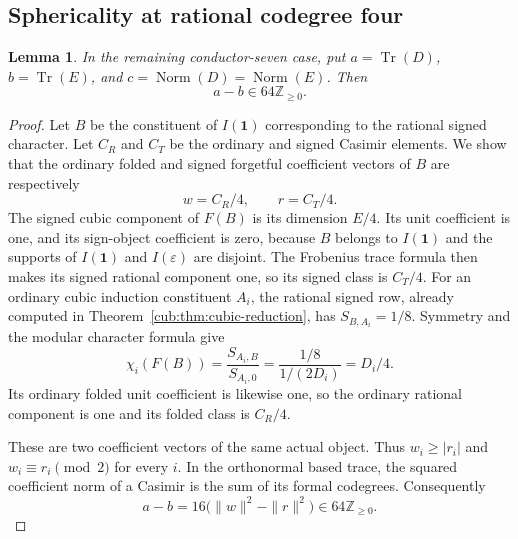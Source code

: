\documentclass[11pt,a4paper]{article}
\newtheorem{lemma}[theorem]{Lemma}
\theoremstyle{definition}\newtheorem{definition}[theorem]{Definition}
\theoremstyle{remark}\newtheorem{remark}[theorem]{Remark}
\DeclareMathOperator{\Tr}{Tr}
\newcommand{\ZZ}{\mathbb Z}
\numberwithin{equation}{section}
\begin{document}
\subsection{Sphericality at rational codegree four}

\begin{lemma}\label{cub:lem:cubic-four-trace-gap}
In the remaining conductor-seven case, put
$a=\Tr(D)$, $b=\Tr(E)$, and $c=\operatorname{Norm}(D)
=\operatorname{Norm}(E)$. Then
\[
 a-b\in64\ZZ_{\ge0}.
\]
\end{lemma}
\begin{proof}
Let $B$ be the constituent of $I(\mathbf1)$ corresponding to the
rational signed character. Let $C_R$ and $C_T$ be the ordinary and
signed Casimir elements. We show that the ordinary folded and signed
forgetful coefficient vectors of $B$ are respectively
\[
 w=C_R/4,\qquad r=C_T/4.
\]
The signed cubic component of $F(B)$ is its dimension $E/4$.
Its unit coefficient is one, and its sign-object coefficient is zero,
because $B$ belongs to $I(\mathbf1)$ and the supports of $I(\mathbf1)$
and $I(\varepsilon)$ are disjoint. The Frobenius trace formula then
makes its signed rational component one, so its signed class is $C_T/4$.
For an ordinary cubic induction constituent $A_i$, the rational signed
row, already computed in Theorem~\ref{cub:thm:cubic-reduction},
has $S_{B,A_i}=1/8$. Symmetry and the modular character formula give
\[
 \chi_i(F(B))=\frac{S_{A_i,B}}{S_{A_i,0}}
             =\frac{1/8}{1/(2D_i)}=D_i/4.
\]
Its ordinary folded unit coefficient is likewise one, so the ordinary
rational component is one and its folded class is $C_R/4$.

These are two coefficient vectors of the same actual object. Thus
$w_i\ge|r_i|$ and $w_i\equiv r_i\pmod2$ for every $i$. In the
orthonormal based trace, the squared coefficient norm of a Casimir is
the sum of its formal codegrees. Consequently
\[
 a-b=16\bigl(\|w\|^2-\|r\|^2\bigr)\in64\ZZ_{\ge0}.
\]
\end{proof}
\end{document}
